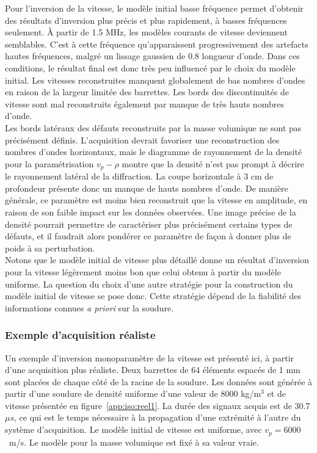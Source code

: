 Pour l'inversion de la vitesse, le modèle initial basse fréquence permet d'obtenir des résultats d'inversion plus précis et plus rapidement, à basses fréquences seulement. À partir de 1.5 MHz, les modèles courants de vitesse deviennent semblables. C'est à cette fréquence qu'apparaissent progressivement  des artefacts hautes fréquences, malgré un lissage gaussien de 0.8 longueur d'onde. Dans ces conditions, le résultat final est donc très peu influencé par le choix du modèle initial. 
\indent Les vitesses reconstruites manquent globalement de bas nombres d'ondes en raison de la largeur limitée des barrettes. Les bords des discontinuités de vitesse sont mal reconstruits également par manque de très hauts nombres d'onde. \\


Les bords latéraux des défauts reconstruits par la masse volumique ne sont pas précisément définis. L'acquisition devrait favoriser une reconstruction des nombres d'ondes horizontaux, mais le diagramme de rayonnement de la densité pour la paramétrisation $v_{p}-\rho$ montre que la densité n'est pas prompt à décrire le rayonnement latéral de la diffraction. La coupe horizontale à 3 cm de profondeur présente donc un manque de hauts nombres d'onde. De manière générale, ce paramètre est moins bien reconstruit que la vitesse en amplitude, en raison de son faible impact sur les données observées. Une image précise de la densité pourrait permettre de caractériser plus précisément certains types de défauts, et il faudrait alors pondérer ce paramètre de façon à donner plus de poids à sa perturbation.\\

Notons que le modèle initial de vitesse plus détaillé donne un résultat d'inversion pour la vitesse légèrement moins bon que celui obtenu à partir du modèle uniforme. La question du choix d'une autre stratégie pour la construction du modèle initial de vitesse se pose donc. Cette stratégie dépend de la fiabilité des informations connues \emph{a priori} sur la soudure.


\subsubsection{Exemple d'acquisition réaliste}
Un exemple d'inversion monoparamètre de la vitesse est présenté ici, à partir d'une acquisition plus réaliste. Deux barrettes de 64 éléments espacés de 1 mm sont placées de chaque côté de la racine de la soudure. Les données sont générée à partir d'une soudure de densité uniforme d'une valeur de 8000 kg/m$^{3}$ et de vitesse présentée en figure~\ref{app:iso:reel1}. La durée des signaux acquis est de 30.7 $\mu s$, ce qui est le temps nécessaire à la propagation d'une extrémité à l'autre du système d'acquisition. Le modèle initial de vitesse est uniforme, avec $v_{p}=6000$~m/s. Le modèle pour la masse volumique est fixé à sa valeur vraie.\\

